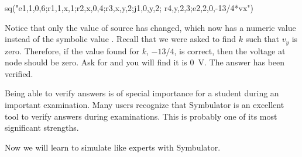 \begin{entry}
sq\dc("e1,1,0,6;r1,1,x,1;r2,x,0,4;r3,x,y,2;j1,0,y,2;
      r4,y,2,3;e2,2,0,-13/4*vx")
\end{entry}

Notice that only the value of source  has changed, which
now has a numeric value instead of the symbolic value .
Recall that we were asked to find $k$ such that $v_y$ is zero.
Therefore, if the value found for $k$, $-13/4$, is correct, then the
voltage at node  should be zero. Ask for  and you
will find it is 0~V. The answer has been verified.

Being able to verify answers is of special importance for a student
during an important examination. Many users recognize that
Symbulator is an excellent tool to verify answers during
examinations. This is probably one of its most significant
strengths.

Now we will learn to simulate like experts with Symbulator.
